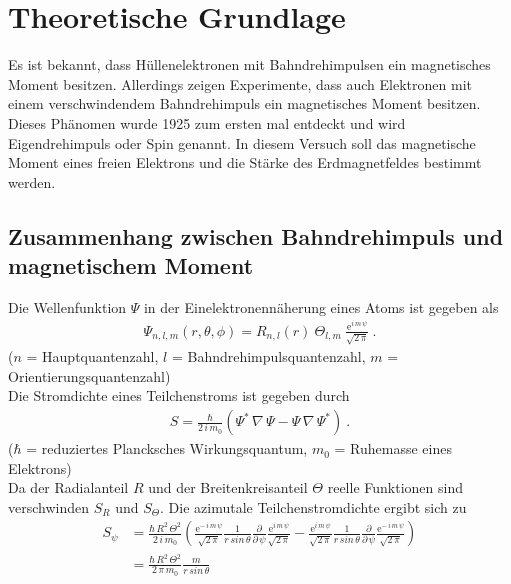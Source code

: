 \section{Theoretische Grundlage}
\label{sec:Theorie}
Es ist bekannt, dass Hüllenelektronen mit Bahndrehimpulsen ein magnetisches Moment besitzen. Allerdings zeigen Experimente, dass auch Elektronen mit einem verschwindendem Bahndrehimpuls ein magnetisches Moment besitzen. Dieses Phänomen wurde 1925 zum ersten mal entdeckt und wird Eigendrehimpuls oder Spin genannt. In diesem Versuch soll das magnetische Moment eines freien Elektrons und die Stärke des Erdmagnetfeldes bestimmt werden.



\subsection{Zusammenhang zwischen Bahndrehimpuls und magnetischem Moment}
Die Wellenfunktion $\Psi$ in der Einelektronennäherung eines Atoms ist gegeben als
\begin{align}
	\Psi_{n,l,m}(r,\theta,\phi) = R_{n,l}(r)\ \Theta_{l,m}\ \frac{\text{e}^{i\,m\,\psi}}{\sqrt{2\,\pi}} \ .
\end{align}
\hfill \footnotesize{($n$ = Hauptquantenzahl, $l$ = Bahndrehimpulsquantenzahl, $m$ = Orientierungsquantenzahl)} \hfill \vspace{0.25cm}\\
Die Stromdichte eines Teilchenstroms ist gegeben durch
\begin{align}
	S = \frac{\hbar}{2\,i\,m_0}\left( \Psi^*\,\nabla\,\Psi - \Psi\,\nabla\,\Psi^* \right) \ .
\end{align}
\hfill \footnotesize{($\hbar$ = reduziertes Plancksches Wirkungsquantum, $m_0$ = Ruhemasse eines Elektrons)} \hfill \vspace{0.25cm}\\
Da der Radialanteil $R$ und der Breitenkreisanteil $\Theta$ reelle Funktionen sind verschwinden $S_R$ und $S_\Theta$. Die azimutale Teilchenstromdichte ergibt sich zu
\begin{align}\label{eqn:aS} %
	S_\psi &= \frac{\hbar\,R^2\,\Theta^2}{2\,i\,m_0} \left( \frac{\text{e}^{-\,i\,m\,\psi}}{\sqrt{2\,\pi}} \frac{1}{r\,sin\,\theta} \frac{\partial}{\partial\,\psi} \frac{\text{e}^{i\,m\,\psi}}{\sqrt{2\,\pi}} - \frac{\text{e}^{i\,m\,\psi}}{\sqrt{2\,\pi}} \frac{1}{r\,sin\,\theta} \frac{\partial}{\partial\,\psi} \frac{\text{e}^{-\,i\,m\,\psi}}{\sqrt{2\,\pi}} \right) \nonumber \\
	&= \frac{\hbar\,R^2\,\Theta^2}{2\,\pi\,m_0}\frac{m}{r\,sin\,\theta}
\end{align}
